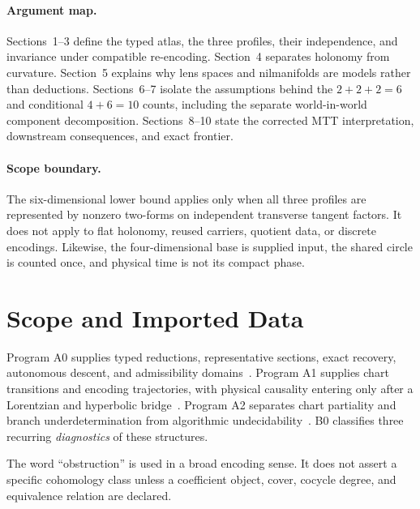 \documentclass[11pt]{article}
\begin{document}
\paragraph{Argument map.}
Sections~1--3 define the typed atlas, the three profiles, their independence,
and invariance under compatible re-encoding.  Section~4 separates holonomy
from curvature.  Section~5 explains why lens spaces and nilmanifolds are
models rather than deductions.  Sections~6--7 isolate the assumptions behind
the $2+2+2=6$ and conditional $4+6=10$ counts, including the separate
world-in-world component decomposition.  Sections~8--10 state the corrected
MTT interpretation, downstream consequences, and exact frontier.

\paragraph{Scope boundary.}
The six-dimensional lower bound applies only when all three profiles are
represented by nonzero two-forms on independent transverse tangent factors.
It does not apply to flat holonomy, reused carriers, quotient data, or
discrete encodings.  Likewise, the four-dimensional base is supplied input,
the shared circle is counted once, and physical time is not its compact phase.

\tableofcontents
\newpage

\section{Scope and Imported Data}

Program A0 supplies typed reductions, representative sections, exact recovery,
autonomous descent, and admissibility domains~\cite{A0}.  Program A1 supplies
chart transitions and encoding trajectories, with physical causality entering
only after a Lorentzian and hyperbolic bridge~\cite{A1}.  Program A2 separates
chart partiality and branch underdetermination from algorithmic
undecidability~\cite{A2}.  B0 classifies three recurring \emph{diagnostics} of
these structures.

The word ``obstruction'' is used in a broad encoding sense.  It does not assert
a specific cohomology class unless a coefficient object, cover, cocycle degree,
and equivalence relation are declared.
\end{document}
